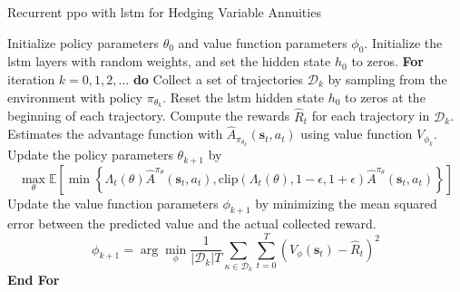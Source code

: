 \begin{algorithm}
    \caption{Recurrent \gls{ppo} with \gls{lstm} for Hedging Variable Annuities} 
    \begin{algorithmic}[1] \label{alg3:ppoHedging-rnn}
        \STATE  Initialize policy parameters $\theta_0$ and value function parameters $\phi_0$.
        \STATE  Initialize the \gls{lstm} layers with random weights, and set the hidden state $h_0$ to zeros.
        \STATE  \textbf{For} {iteration $k=0, 1,2,\ldots$} \textbf{do}
        \STATE  \quad Collect a set of trajectories $\mathcal{D}_k$ by sampling from the environment with policy $\pi_{\theta_{k}}$.
        \STATE  \quad Reset the \gls{lstm} hidden state $h_0$ to zeros at the beginning of each trajectory.
        \STATE  \quad Compute the rewards $\hat{R}_t$ for each trajectory in $\mathcal{D}_k$.
        \STATE  \quad Estimates the advantage function with $\hat{A}_{\pi_{\theta_k}}(\mathbf{s}_t, a_t)$ using value function $V_{\phi_k}$.
        \STATE  \quad Update the policy parameters $\theta_{k+1}$ by 
        \begin{equation*}
            \max_{\theta} \mathbb{E}\left[ \min \left\{ \Lambda_t(\theta)\hat{A}^{\pi_{\theta}}(\mathbf{s}_t, a_t), \text{clip}(\Lambda_t(\theta), 1-\epsilon, 1 + \epsilon) \hat{A}^{\pi_{\theta}}(\mathbf{s}_t, a_t)  \right\} \right]
        \end{equation*}
        \STATE  \quad Update the value function parameters $\phi_{k+1}$ by minimizing the mean squared error between the predicted value and the actual collected reward.
        \begin{equation*}
            \phi_{k+1} = \arg \min_{\phi} \frac{1}{|\mathcal{D}_k|T} \sum_{\mathcal{\kappa} \in \mathcal{D}_k} \sum_{t=0}^{T} \left( V_{\phi}(\mathbf{s}_t) - \hat{R}_t \right)^2
        \end{equation*}
        \STATE  \textbf{End For}
    \end{algorithmic}
\end{algorithm}

